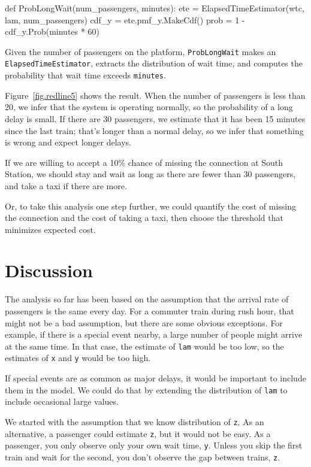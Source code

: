 \documentclass[12pt]{book}
\theoremstyle{exercise}
\begin{document}
\begin{code}
def ProbLongWait(num_passengers, minutes):
    ete = ElapsedTimeEstimator(wtc, lam, num_passengers)
    cdf_y = ete.pmf_y.MakeCdf()
    prob = 1 - cdf_y.Prob(minutes * 60)
\end{code}

Given the number of passengers on the platform,
{\tt ProbLongWait} 
makes an {\tt ElapsedTimeEstimator},
extracts the distribution of wait time, and 
computes 
the probability that wait time
exceeds {\tt minutes}.

Figure~\ref{fig.redline5} shows the result.  When the number of
passengers is less than 20, we infer that the system is
operating normally, so the probability of a long delay is small.
If there are 30 passengers, we estimate that it has been 15
minutes since the last train; that's longer than a normal delay,
so we infer that something is wrong and expect longer delays.

If we are willing to accept a 10\% chance of missing the connection
at South Station, we should stay and wait as long as there
are fewer than 30 passengers, and take a taxi if there are more.

Or, to take this analysis one step further, we could quantify the cost
of missing the connection and the cost of taking a taxi, then choose
the threshold that minimizes expected cost.

\section{Discussion}

The analysis so far has been based on the assumption that the
arrival rate of passengers is the same every day.  For a commuter
train during rush hour, that might not be a bad assumption, but
there are some obvious exceptions.  For example, if there is a special
event nearby, a large number of people might arrive at the same time.
In that case, the estimate of {\tt lam} would be too low, so the
estimates of {\tt x} and {\tt y} would be too high.

If special events are as common as major delays, it would
be important to include them in the model.  We could do that by
extending the distribution of {\tt lam} to include occasional
large values.

We started with the assumption that we know
distribution of {\tt z}.
As an alternative, a passenger could estimate {\tt z}, but it would
not be easy.
As a passenger, you only
observe only your own wait time, {\tt y}.  Unless you skip
the first train and wait for the second, you don't
observe the gap between trains, {\tt z}.
\end{document}
